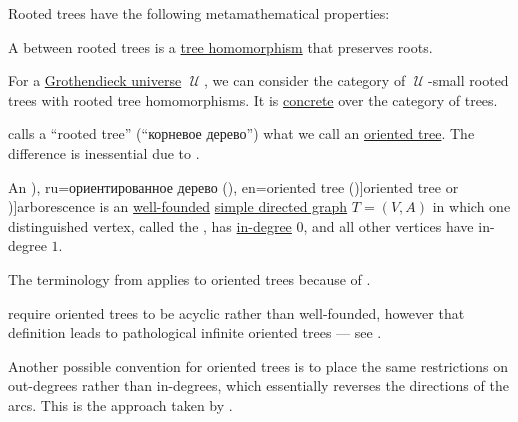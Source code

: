 \begin{definition}
  Rooted trees have the following metamathematical properties:
  \begin{thmenum}[resume=def:rooted_tree]
    \mimprovised A  between rooted trees is a \hyperref[def:tree/homomorphism]{tree homomorphism} that preserves roots.

    \mimprovised For a \hyperref[def:grothendieck_universe]{Grothendieck universe} \( \mscrU \), we can consider the category of \( \mscrU \)-small rooted trees with rooted tree homomorphisms. It is \hyperref[def:concrete_category]{concrete} over the category of trees.
  \end{thmenum}
\end{definition}
\begin{comments}
  \item {} calls a \enquote{rooted tree} (\enquote{корневое дерево}) what we call an \hyperref[def:oriented_tree]{oriented tree}. The difference is inessential due to .
\end{comments}

\begin{definition}\label{def:oriented_tree}\mimprovised
  An \term[bg=ориентирано дърво (\cite[21]{Мирчев2001}), ru=ориентированное дерево (\cite[def. 5.6]{БелоусовТкачёв2004}), en=oriented tree (\cite[373]{Knuth1997Vol1})]{oriented tree} or \term[en=arborescence (\cite[\textnumero 3.1]{GondranMinoux1984Graphs})]{arborescence} is an \hyperref[def:well_founded_graph]{well-founded} \hyperref[def:directed_graph]{simple directed graph} \( T = (V, A) \) in which one distinguished vertex, called the , has \hyperref[def:graph_cardinality/directed_degree]{in-degree} \( 0 \), and all other vertices have in-degree \( 1 \).
\end{definition}
\begin{comments}
  \item The terminology from  applies to oriented trees because of .

  \item {} require oriented trees to be acyclic rather than well-founded, however that definition leads to pathological infinite oriented trees --- see .

  \item Another possible convention for oriented trees is to place the same restrictions on out-degrees rather than in-degrees, which essentially reverses the directions of the arcs. This is the approach taken by .
\end{comments}

